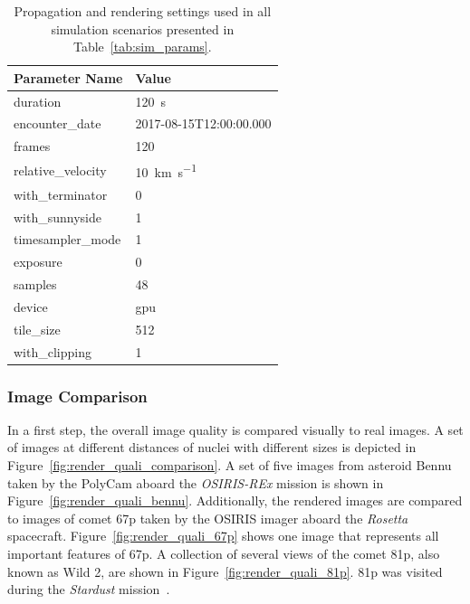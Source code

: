 \begin{table}[htb]
    \centering
    \caption{Propagation and rendering settings used in all simulation scenarios presented in Table~\ref{tab:sim_params}.}
    \label{tab:sim_settings}
    \begin{tabular}{l|l}
        \textbf{Parameter Name} & \textbf{Value} \\ \hline
        duration       & \SI{120}{\second}   \\
        encounter\_date & 2017-08-15T12:00:00.000\\
        frames       & \SI{120}{}     \\
        relative\_velocity     &  \SI{10}{\kilo\meter\per\second} \\
        with\_terminator  & \SI{0}{} \\
        with\_sunnyside & \SI{1}{} \\
        timesampler\_mode & \SI{1}{} \\
        exposure & \SI{0}{} \\
        samples & \SI{48}{} \\
        device & \gls{gpu} \\
        tile\_size & \SI{512}{} \\
        with\_clipping & \SI{1}{}
    \end{tabular}
\end{table}

\subsubsection{Image Comparison}
In a first step, the overall image quality is compared visually to real images. A set of images at different distances of nuclei with different sizes is depicted in Figure~\ref{fig:render_quali_comparison}. A set of five images from asteroid Bennu taken by the PolyCam aboard the \textit{OSIRIS-REx} mission is shown in Figure~\ref{fig:render_quali_bennu}. Additionally, the rendered images are compared to images of comet \gls{67p} taken by the OSIRIS imager aboard the \textit{Rosetta} spacecraft. Figure~\ref{fig:render_quali_67p} shows one image that represents all important features of \gls{67p}. A collection of several views of the comet \gls{81p}, also known as Wild 2, are shown in Figure~\ref{fig:render_quali_81p}. \Gls{81p} was visited during the \textit{Stardust} mission~\cite{Brownlee2003Stardust:Mission}.

